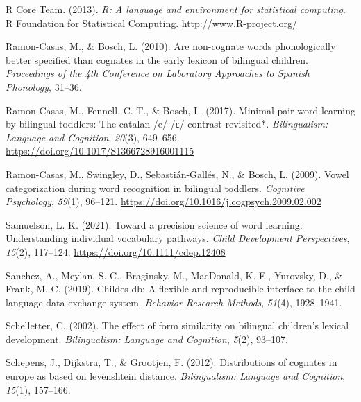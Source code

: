 \documentclass[
  man,
  floatsintext,
  colorlinks=true,linkcolor=blue,citecolor=blue,urlcolor=blue,biblatex]{apa7}
\newlength{\cslhangindent}
\newlength{\cslentryspacingunit} %
\newenvironment{CSLReferences}[2] %
 {%
  \setlength{\parindent}{0pt}
  \ifodd #1
  \let\oldpar\par
  \def\par{\hangindent=\cslhangindent\oldpar}
  \fi
  \setlength{\parskip}{#2\cslentryspacingunit}
 }%
 {}
\begin{document}
\begin{CSLReferences}{1}{0}
\leavevmode{}%
R Core Team. (2013). \emph{R: A language and environment for statistical
computing}. R Foundation for Statistical Computing.
\url{http://www.R-project.org/}

\leavevmode{}%
Ramon-Casas, M., \& Bosch, L. (2010). Are non-cognate words
phonologically better specified than cognates in the early lexicon of
bilingual children. \emph{Proceedings of the 4th Conference on
Laboratory Approaches to Spanish Phonology}, 31--36.

\leavevmode{}%
Ramon-Casas, M., Fennell, C. T., \& Bosch, L. (2017). Minimal-pair word
learning by bilingual toddlers: The catalan /e/-/ɛ/ contrast revisited*.
\emph{Bilingualism: Language and Cognition}, \emph{20}(3), 649--656.
\url{https://doi.org/10.1017/S1366728916001115}

\leavevmode{}%
Ramon-Casas, M., Swingley, D., Sebastián-Gallés, N., \& Bosch, L.
(2009). Vowel categorization during word recognition in bilingual
toddlers. \emph{Cognitive Psychology}, \emph{59}(1), 96--121.
\url{https://doi.org/10.1016/j.cogpsych.2009.02.002}

\leavevmode{}%
Samuelson, L. K. (2021). Toward a precision science of word learning:
Understanding individual vocabulary pathways. \emph{Child Development
Perspectives}, \emph{15}(2), 117--124.
\url{https://doi.org/10.1111/cdep.12408}

\leavevmode{}%
Sanchez, A., Meylan, S. C., Braginsky, M., MacDonald, K. E., Yurovsky,
D., \& Frank, M. C. (2019). Childes-db: A flexible and reproducible
interface to the child language data exchange system. \emph{Behavior
Research Methods}, \emph{51}(4), 1928--1941.

\leavevmode{}%
Schelletter, C. (2002). The effect of form similarity on bilingual
children's lexical development. \emph{Bilingualism: Language and
Cognition}, \emph{5}(2), 93--107.

\leavevmode{}%
Schepens, J., Dijkstra, T., \& Grootjen, F. (2012). Distributions of
cognates in europe as based on levenshtein distance. \emph{Bilingualism:
Language and Cognition}, \emph{15}(1), 157--166.


\end{CSLReferences}
\end{document}
